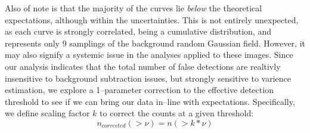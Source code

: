 \documentclass[floatfix, apj]{emulateapj}
\begin{document}
Also of note is that the majority of the curves lie {\it below} the theoretical expectations, although within the uncertainties.
This is not entirely unexpected, as each curve is strongly correlated, being a cumulative distribution, and represents only 9 samplings of the background random Gaussian field.
However, it may also signify a systemic issue in the analyses applied to these images.
Since our analysis indicates that the total number of false detections are realtivly insensitive to background subtraction issues, but strongly sensitive to varience estimation,
we explore a 1--parameter correction to the effective detection threshold to see if we can bring our data in--line with expectations.
Specifically, we define scaling factor $k$ to correct the counts at a given threshold:
\begin{equation}
n_{corrected}(>\nu) = n(> k * \nu)
\label{correction}
\end{equation}
\end{document}
